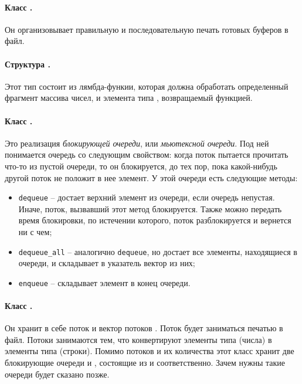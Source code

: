 \documentclass[a4paper, 12pt, twoside]{article}
\begin{document}
\paragraph{Класс \texttt{}.}
Он организовывает правильную и последовательную печать готовых буферов в файл. 
\paragraph{Структура \texttt{}.}
Этот тип состоит из лямбда-функии, которая должна обработать определенный фрагмент массива чисел, и элемента типа \texttt{}, возвращаемый функцией.
\paragraph{Класс \texttt{}.}
Это реализация \textit{блокирующей очереди}, или \textit{мьютексной очереди}.  
Под ней понимается очередь со следующим свойством: когда поток пытается прочитать что-то из пустой очереди, то он блокируется, до тех пор, пока какой-нибудь другой поток не положит в нее элемент.
У этой очереди есть следующие методы:
\begin{itemize}
\item \texttt{dequeue} -- достает верхний элемент из очереди, если очередь непустая.
Иначе, поток, вызвавший этот метод блокируется. Также можно передать время блокировки, по истечении которого, поток разблокируется и вернется ни с чем;
\item \texttt{dequeue\_all} -- аналогично \texttt{dequeue}, но достает все элементы, находящиеся в очереди, и складывает в указатель вектор из них;
\item \texttt{enqueue} -- складывает элемент в конец очереди.
\end{itemize}
\paragraph{Класс \texttt{}.} 
Он хранит в себе поток \texttt{} и вектор потоков \texttt{}.
Поток \texttt{} будет заниматься печатью в файл.
Потоки \texttt{} занимаются тем, что конвертируют элементы типа \texttt{} (числа) в элементы типа \texttt{} (строки).
Помимо потоков и их количества этот класс хранит две блокирующие очереди \texttt{} и \texttt{}, состоящие из \texttt{} и \texttt{} соответственно. 
Зачем нужны такие очереди будет сказано позже.
\end{document}
